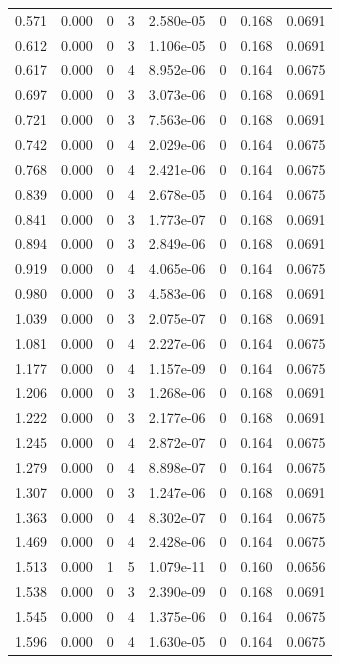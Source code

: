 \documentclass[preview]{standalone}
\begin{document}
{{\begin{tabular}{L{1.2cm}C{1.2cm} C{0.3cm}C{0.5cm} C{1.4cm}C{1.4cm} C{1.4cm}C{1.4cm}}
  0.571  &  0.000  & 0     &  3 &  2.580e-05  & 0  & 0.168 &  0.0691   \\ 
  0.612  &  0.000  & 0     &  3 &  1.106e-05  & 0  & 0.168 &  0.0691   \\ 
  0.617  &  0.000  & 0     &  4 &  8.952e-06  & 0  & 0.164 &  0.0675   \\ 
  0.697  &  0.000  & 0     &  3 &  3.073e-06  & 0  & 0.168 &  0.0691   \\ 
  0.721  &  0.000  & 0     &  3 &  7.563e-06  & 0  & 0.168 &  0.0691   \\ 
  0.742  &  0.000  & 0     &  4 &  2.029e-06  & 0  & 0.164 &  0.0675   \\ 
  0.768  &  0.000  & 0     &  4 &  2.421e-06  & 0  & 0.164 &  0.0675   \\ 
  0.839  &  0.000  & 0     &  4 &  2.678e-05  & 0  & 0.164 &  0.0675   \\ 
  0.841  &  0.000  & 0     &  3 &  1.773e-07  & 0  & 0.168 &  0.0691   \\ 
  0.894  &  0.000  & 0     &  3 &  2.849e-06  & 0  & 0.168 &  0.0691   \\ 
  0.919  &  0.000  & 0     &  4 &  4.065e-06  & 0  & 0.164 &  0.0675   \\ 
  0.980  &  0.000  & 0     &  3 &  4.583e-06  & 0  & 0.168 &  0.0691   \\ 
  1.039  &  0.000  & 0     &  3 &  2.075e-07  & 0  & 0.168 &  0.0691   \\ 
  1.081  &  0.000  & 0     &  4 &  2.227e-06  & 0  & 0.164 &  0.0675   \\ 
  1.177  &  0.000  & 0     &  4 &  1.157e-09  & 0  & 0.164 &  0.0675   \\ 
  1.206  &  0.000  & 0     &  3 &  1.268e-06  & 0  & 0.168 &  0.0691   \\ 
  1.222  &  0.000  & 0     &  3 &  2.177e-06  & 0  & 0.168 &  0.0691   \\ 
  1.245  &  0.000  & 0     &  4 &  2.872e-07  & 0  & 0.164 &  0.0675   \\ 
  1.279  &  0.000  & 0     &  4 &  8.898e-07  & 0  & 0.164 &  0.0675   \\ 
  1.307  &  0.000  & 0     &  3 &  1.247e-06  & 0  & 0.168 &  0.0691   \\ 
  1.363  &  0.000  & 0     &  4 &  8.302e-07  & 0  & 0.164 &  0.0675   \\ 
  1.469  &  0.000  & 0     &  4 &  2.428e-06  & 0  & 0.164 &  0.0675   \\ 
  1.513  &  0.000  & 1     &  5 &  1.079e-11  & 0  & 0.160 &  0.0656   \\ 
  1.538  &  0.000  & 0     &  3 &  2.390e-09  & 0  & 0.168 &  0.0691   \\ 
  1.545  &  0.000  & 0     &  4 &  1.375e-06  & 0  & 0.164 &  0.0675   \\ 
  1.596  &  0.000  & 0     &  4 &  1.630e-05  & 0  & 0.164 &  0.0675   \\ 
\hline 
\end{tabular} 

}}
\end{document}
